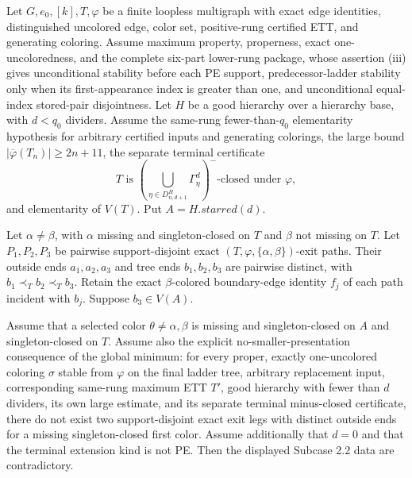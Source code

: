\begin{lemma}
Let $G,e_0,[k],T,\varphi$ be a finite loopless multigraph with exact edge
identities, distinguished uncolored edge, color set, positive-rung
certified ETT, and generating coloring.  Assume maximum property,
properness, exact one-uncoloredness, and the complete six-part lower-rung
package, whose assertion (iii) gives unconditional stability before each PE
support, predecessor-ladder stability only when its first-appearance index is
greater than one, and unconditional equal-index stored-pair disjointness.  Let $H$ be a good hierarchy over a hierarchy base, with
$d<q_0$ dividers.  Assume the same-rung fewer-than-$q_0$ elementarity
hypothesis for arbitrary certified inputs and generating colorings, the
large bound $|\overline\varphi(T_n)|\geq2n+11$, the separate terminal
certificate
\[
 T\text{ is }
 \left(\bigcup_{\eta\in D^H_{n,d+1}}\Gamma^d_\eta\right)^-
 \text{-closed under }\varphi,
\]
and elementarity of $V(T)$.  Put $A=H.\mathit{starred}(d)$.

Let $\alpha\ne\beta$, with $\alpha$ missing and singleton-closed on $T$
and $\beta$ not missing on $T$.  Let $P_1,P_2,P_3$ be pairwise
support-disjoint exact $(T,\varphi,\{\alpha,\beta\})$-exit paths.  Their
outside ends $a_1,a_2,a_3$ and tree ends $b_1,b_2,b_3$ are pairwise
distinct, with $b_1\prec_T b_2\prec_T b_3$.  Retain the exact
$\beta$-colored boundary-edge identity $f_j$ of each path incident with
$b_j$.  Suppose $b_3\in V(A)$.

Assume that a selected color $\theta\ne\alpha,\beta$ is missing and
singleton-closed on $A$ and singleton-closed on $T$.  Assume also the
explicit no-smaller-presentation consequence of the global minimum: for
every proper, exactly one-uncolored coloring $\sigma$ stable from
$\varphi$ on the final ladder tree, arbitrary replacement input,
corresponding same-rung maximum ETT $T'$, good hierarchy with fewer than
$d$ dividers, its own large estimate, and its separate terminal
minus-closed certificate, there do not exist two support-disjoint exact
exit legs with distinct outside ends for a missing singleton-closed first
color.  Assume additionally that $d=0$ and that the terminal extension
kind is not PE.  Then the displayed Subcase 2.2 data are contradictory.
\end{lemma}
